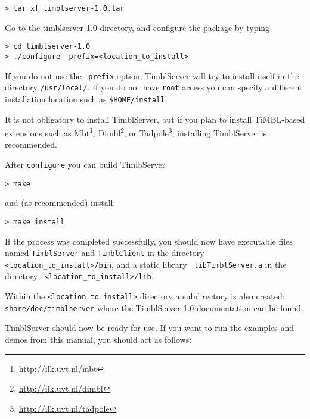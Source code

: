 \documentclass{report}
\begin{document}
{\tt > tar xf timblserver-1.0.tar}

Go to the timblserver-1.0 directory, and configure the package by typing

{\tt > cd timblserver-1.0} \\
{\tt > ./configure --prefix=<location\_to\_install>}

If you do not use the {\tt --prefix} option, TimblServer will try to
install itself in the directory {\tt /usr/local/}.  If you do not have
{\tt root} access you can specify a different installation location
such as {\tt \$HOME/install}

It is not obligatory to install TimblServer, but if you plan to
install TiMBL-based extensions such as
Mbt\footnote{\url{http://ilk.uvt.nl/mbt}},
Dimbl\footnote{\url{http://ilk.uvt.nl/dimbl}}, or
Tadpole\footnote{\url{http://ilk.uvt.nl/tadpole}}, installing
TimblServer is recommended.

After {\tt configure} you can build TimlbServer

{\tt > make}

and (as recommended) install:

{\tt > make install }

If the process was completed successfully, you should now have
executable files named {\tt TimblServer} and {\tt TimblClient} in the
directory {\tt <location\_to\_install>/bin}, and a static library {\tt
  libTimblServer.a} in the directory {\tt
  <location\_to\_install>/lib}.

Within the {\tt <location\_to\_install>} directory a subdirectory is
also created: {\tt share/doc/timblserver} where the TimblServer 1.0
documentation can be found.

TimblServer should now be ready for use. If you want to run the
examples and demos from this manual, you should act as follows:
\end{document}
